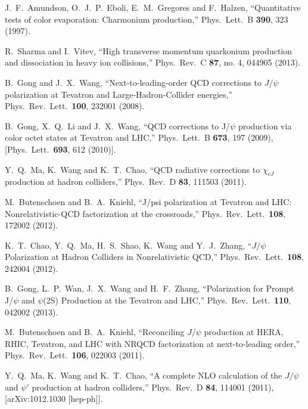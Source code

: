 \documentclass[aps,prc,preprint,superscriptaddress,showpacs,showkeys,amsmath]{revtex4-1}
\begin{document}
\begin{thebibliography}{100}
  J.~F.~Amundson, O.~J.~P.~Eboli, E.~M.~Gregores and F.~Halzen,
  ``Quantitative tests of color evaporation: Charmonium production,''
  Phys.\ Lett.\ B {\bf 390}, 323 (1997).



  R.~Sharma and I.~Vitev,
  ``High transverse momentum quarkonium production and dissociation in heavy ion collisions,''
  Phys.\ Rev.\ C {\bf 87}, no. 4, 044905 (2013).


  B.~Gong and J.~X.~Wang,
  ``Next-to-leading-order QCD corrections to $J/\psi$ polarization at Tevatron and Large-Hadron-Collider energies,''
  Phys.\ Rev.\ Lett.\  {\bf 100}, 232001 (2008).
  

  B.~Gong, X.~Q.~Li and J.~X.~Wang,
  ``QCD corrections to J/$\psi$ production via color octet states at Tevatron and LHC,''
  Phys.\ Lett.\ B {\bf 673}, 197 (2009),
  [Phys.\ Lett.\  {\bf 693}, 612 (2010)].
  
  Y.~Q.~Ma, K.~Wang and K.~T.~Chao,
  ``QCD radiative corrections to $\chi_{cJ}$ production at hadron colliders,''
  Phys.\ Rev.\ D {\bf 83}, 111503 (2011).


  M.~Butenschoen and B.~A.~Kniehl,
  ``J/psi polarization at Tevatron and LHC: Nonrelativistic-QCD factorization at the crossroads,''
  Phys.\ Rev.\ Lett.\  {\bf 108}, 172002 (2012).
  
  K.~T.~Chao, Y.~Q.~Ma, H.~S.~Shao, K.~Wang and Y.~J.~Zhang,
  ``$J/\psi$ Polarization at Hadron Colliders in Nonrelativistic QCD,''
  Phys.\ Rev.\ Lett.\  {\bf 108}, 242004 (2012).
  
  B.~Gong, L.~P.~Wan, J.~X.~Wang and H.~F.~Zhang,
  ``Polarization for Prompt J/$\psi$ and $\psi$(2S) Production at the Tevatron and LHC,''
  Phys.\ Rev.\ Lett.\  {\bf 110}, 042002 (2013).
 
  M.~Butenschoen and B.~A.~Kniehl,
  ``Reconciling $J/\psi$ production at HERA, RHIC, Tevatron, and LHC with NRQCD factorization at next-to-leading order,''
  Phys.\ Rev.\ Lett.\  {\bf 106}, 022003 (2011). 
 

  Y.~Q.~Ma, K.~Wang and K.~T.~Chao,
  ``A complete NLO calculation of the $J/\psi$ and $\psi'$ production at hadron colliders,''
  Phys.\ Rev.\ D {\bf 84}, 114001 (2011),
  [arXiv:1012.1030 [hep-ph]].



\end{thebibliography}
\end{document}
